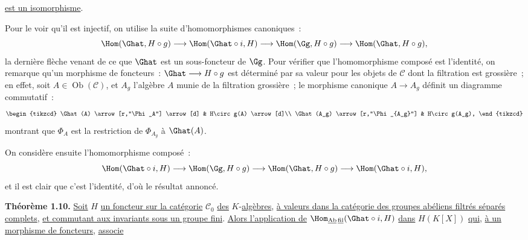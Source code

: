 
\uline{est un
isomorphisme}.

Pour le voir qu'il est injectif, on utilise la suite d'homomorphismes canoniques~:
\[
  \Hom(\Ghat,H\circ g)\longrightarrow
  \Hom(\Ghat\circ i,H)\longrightarrow
  \Hom(\Gg,H\circ g)\longrightarrow
  \Hom(\Ghat,H\circ g),
\]
la dernière flèche venant de ce que \(\Ghat\) est un sous-foncteur de \(\Gg\). Pour vérifier que l'homomorphisme composé est l'identité, on remarque qu'un morphisme de foncteurs~: \(\Ghat\longrightarrow H\circ g\) est déterminé par sa valeur pour les objets de \(\mathcal C\) dont la filtration est grossière~; en effet, soit \(A\in\operatorname{Ob}(\mathcal C)\), et \(A_g\) l'algèbre \(A\) munie de la filtration grossière~; le morphisme canonique \(A\to A_g\) définit un diagramme commutatif~:
\[
\begin{tikzcd}
\Ghat(A) \arrow[r,"\Phi_A"] \arrow[d] &
H\circ g(A) \arrow[d]\\
\Ghat(A_g) \arrow[r,"\Phi_{A_g}"] &
H\circ g(A_g),
\end{tikzcd}
\]
montrant que \(\Phi_A\) est la restriction de \(\Phi_{A_g}\) à \(\Ghat(A)\).

On considère ensuite l'homomorphisme composé~:
\[
  \Hom(\Ghat\circ i,H)\longrightarrow
  \Hom(\Gg,H\circ g)\longrightarrow
  \Hom(\Ghat,H\circ g)\longrightarrow
  \Hom(\Ghat\circ i,H),
\]
et il est clair que c'est l'identité, d'où le résultat annoncé.

\textbf{Théorème 1.10.} \uline{Soit} \(H\) \uline{un foncteur sur la catégorie} \(\mathcal C_0\) \uline{des} \(K\)-\uline{algèbres}, \uline{à valeurs dans la catégorie des groupes abéliens filtrés séparés complets}, \uline{et commutant aux invariants sous un groupe fini}. \uline{Alors l'application de} \(\Hom_{\underline{\mathrm{Ab}}\,\underline{\mathrm{fil}}}(\Ghat\circ i,H)\) \uline{dans} \(H(K[X])\) \uline{qui}, \uline{à un morphisme de foncteurs}, \uline{associe}
